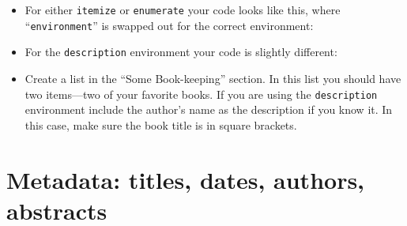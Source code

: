 \begin{itemize}
\item For either \texttt{itemize} or \texttt{enumerate} your code
  looks like this, where ``\texttt{environment}'' is swapped out for
  the correct environment:



\item For the \texttt{description} environment your code is slightly
  different:


\item Create a list in the ``Some Book-keeping'' section. In this list
  you should have two items---two of your favorite books. If you are
  using the \texttt{description} environment include the author's name
  as the description if you know it. In this case, make sure the book
  title is in square brackets.
\end{itemize}

\section{Metadata: titles, dates, authors, abstracts}
